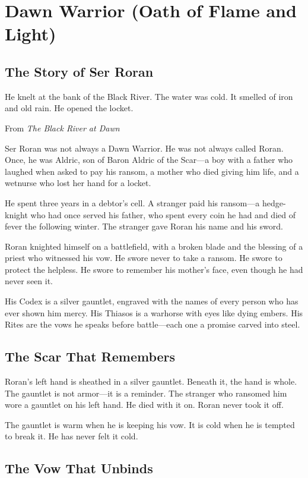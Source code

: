 \section{Dawn Warrior (Oath of Flame and Light)}

\subsection{The Story of Ser Roran}

\epigraph{He knelt at the bank of the Black River. The water was cold. It smelled of iron and old rain. He opened the locket.}{From \textit{The Black River at Dawn}}

Ser Roran was not always a Dawn Warrior. He was not always called Roran. Once, he was Aldric, son of Baron Aldric of the Scar—a boy with a father who laughed when asked to pay his ransom, a mother who died giving him life, and a wetnurse who lost her hand for a locket.

He spent three years in a debtor's cell. A stranger paid his ransom—a hedge-knight who had once served his father, who spent every coin he had and died of fever the following winter. The stranger gave Roran his name and his sword.

Roran knighted himself on a battlefield, with a broken blade and the blessing of a priest who witnessed his vow. He swore never to take a ransom. He swore to protect the helpless. He swore to remember his mother's face, even though he had never seen it.

His Codex is a silver gauntlet, engraved with the names of every person who has ever shown him mercy. His Thiasos is a warhorse with eyes like dying embers. His Rites are the vows he speaks before battle—each one a promise carved into steel.

\subsection{The Scar That Remembers}

Roran's left hand is sheathed in a silver gauntlet. Beneath it, the hand is whole. The gauntlet is not armor—it is a reminder. The stranger who ransomed him wore a gauntlet on his left hand. He died with it on. Roran never took it off.

The gauntlet is warm when he is keeping his vow. It is cold when he is tempted to break it. He has never felt it cold.

\subsection{The Vow That Unbinds}

